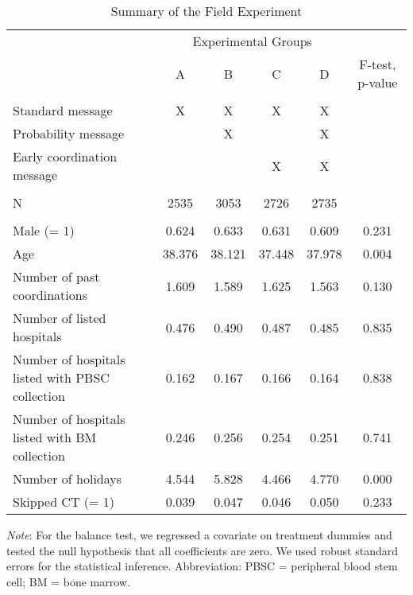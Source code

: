 \documentclass[12pt, a4paper]{article}
\begin{document}
\begin{table}
\centering
\caption{\label{tab:summary}Summary of the Field Experiment}
\centering
\fontsize{9}{11}\selectfont
\begin{threeparttable}
\begin{tabular}[t]{lccccc}
\toprule
\multicolumn{1}{c}{ } & \multicolumn{4}{c}{Experimental Groups} & \multicolumn{1}{c}{ } \\
\cmidrule(l{3pt}r{3pt}){2-5}
 & A & B & C & D & F-test, p-value\\
\midrule
\addlinespace[0.3em]
\multicolumn{6}{l}{\textbf{A. Interventions}}\\
\hspace{1em}Standard message & X & X & X & X & \\
\hspace{1em}Probability message &  & X &  & X & \\
\hspace{1em}Early coordination message &  &  & X & X & \\
\addlinespace[0.3em]
\multicolumn{6}{l}{\textbf{B. Sample Size}}\\
\hspace{1em}N & 2535 & 3053 & 2726 & 2735 & \\
\addlinespace[0.3em]
\multicolumn{6}{l}{\textbf{C. Balance Test}}\\
\hspace{1em}Male (= 1) & 0.624 & 0.633 & 0.631 & 0.609 & 0.231\\
\hspace{1em}Age & 38.376 & 38.121 & 37.448 & 37.978 & 0.004\\
\hspace{1em}Number of past coordinations & 1.609 & 1.589 & 1.625 & 1.563 & 0.130\\
\hspace{1em}Number of listed hospitals & 0.476 & 0.490 & 0.487 & 0.485 & 0.835\\
\hspace{1em}Number of hospitals listed with PBSC collection & 0.162 & 0.167 & 0.166 & 0.164 & 0.838\\
\hspace{1em}Number of hospitals listed with BM collection & 0.246 & 0.256 & 0.254 & 0.251 & 0.741\\
\hspace{1em}Number of holidays & 4.544 & 5.828 & 4.466 & 4.770 & 0.000\\
\hspace{1em}Skipped CT (= 1) & 0.039 & 0.047 & 0.046 & 0.050 & 0.233\\
\bottomrule
\end{tabular}
\begin{tablenotes}
\item \emph{Note}: For the balance test, we regressed a covariate on treatment dummies and tested the null hypothesis that all coefficients are zero. We used robust standard errors for the statistical inference. Abbreviation: PBSC = peripheral blood stem cell; BM = bone marrow.
\end{tablenotes}
\end{threeparttable}
\end{table}
\end{document}
